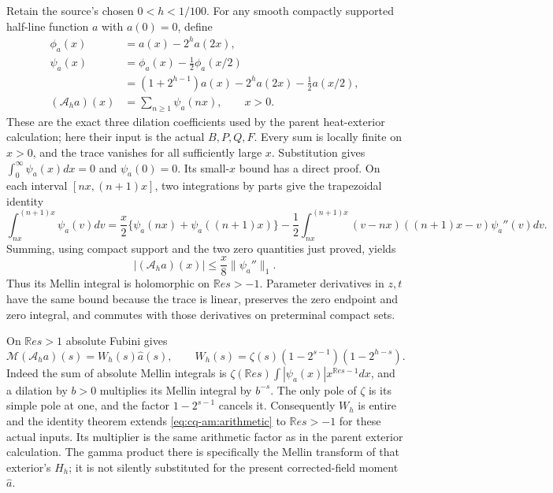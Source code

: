 Retain the source's chosen $0<h<1/100$. For any smooth compactly
supported half-line function $a$ with $a(0)=0$, define
\begin{align*}
 \phi_a(x)&=a(x)-2^h a(2x),\\
 \psi_a(x)&=\phi_a(x)-\tfrac12\phi_a(x/2)\\
  &=(1+2^{h-1})a(x)-2^ha(2x)-\tfrac12a(x/2),\\
 (\mathcal A_h a)(x)&=\sum_{n\geq1}\psi_a(nx),\qquad x>0.
\end{align*}
These are the exact three dilation coefficients used by the parent
heat-exterior calculation; here their input is the actual $B,P,Q,F$.
Every sum is locally finite on $x>0$, and the trace vanishes for all
sufficiently large $x$. Substitution gives
$\int_0^\infty\psi_a(x)dx=0$ and $\psi_a(0)=0$.
Its small-$x$ bound has a direct proof. On each interval $[nx,(n+1)x]$,
two integrations by parts give the trapezoidal identity
\[
 \int_{nx}^{(n+1)x}\psi_a(v)dv
 =\frac{x}{2}\{\psi_a(nx)+\psi_a((n+1)x)\}
 -\frac12\int_{nx}^{(n+1)x}
             (v-nx)((n+1)x-v)\psi_a''(v)dv.
\]
Summing, using compact support and the two zero quantities just
proved, yields
\begin{equation}
 |(\mathcal A_h a)(x)|\leq\frac{x}{8}\|\psi_a''\|_1.
 \label{eq:cq-am:tracebound}
\end{equation}
Thus its Mellin integral is holomorphic on $\mathbb Re s>-1$.
Parameter derivatives in $z,t$ have the same bound because the trace
is linear, preserves the zero endpoint and zero integral, and commutes
with those derivatives on preterminal compact sets.

On $\mathbb Re s>1$ absolute Fubini gives
\begin{equation}
 \mathcal M(\mathcal A_h a)(s)
    =W_h(s)\widehat a(s),\qquad
 W_h(s)=\zeta(s)(1-2^{s-1})(1-2^{h-s}).
 \label{eq:cq-am:arithmetic}
\end{equation}
Indeed the sum of absolute Mellin integrals is
$\zeta(\mathbb Re s)\int|\psi_a(x)|x^{\mathbb Re s-1}dx$, and a dilation by
$b>0$ multiplies its Mellin integral by $b^{-s}$.
The only pole of $\zeta$ is its simple pole at one, and the factor
$1-2^{s-1}$ cancels it. Consequently $W_h$ is entire and the identity
theorem extends \eqref{eq:cq-am:arithmetic} to $\mathbb Re s>-1$ for these
actual inputs. Its multiplier is the same arithmetic factor as in the
parent exterior calculation. The gamma product there is specifically
the Mellin transform of that exterior's $H_h$; it is not silently
substituted for the present corrected-field moment $\widehat a$.

